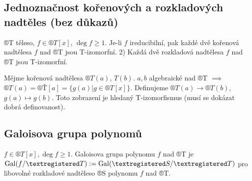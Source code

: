 \documentclass[12pt]{article}                   %
\begin{document}
    \subsection{Jednoznačnost kořenových a rozkladových nadtěles (bez důkazů)}
        \begin{veta}
            ®T těleso, $f \in ®T[x]$, $\deg f ≥ 1$. Je-li $f$ ireducibilní, pak každé dvě kořenová nadtělesa $f$ nad ®T jsou T-izomorfní. 2) Každá dvě rozkladová nadtělesa $f$ nad ®T jsou T-izomorfní.

            \begin{dukazin}[Nástřel]
                Mějme kořenová nadtělesa $®T(a)$, $T(b)$. $a, b$ algebraické nad ®T $\implies$ $®T(a) = ®Ť[a] = \{g(a) | g \in ®T[x]\}$. Definujeme $®T(a) \rightarrow ®T(b)$, $g(a) \mapsto g(b)$. Toto zobrazení je hledaný T-izomorfismus (musí se dokázat dobrá definovanost).
            \end{dukazin}
        \end{veta}

    \subsection{Galoisova grupa polynomů}
        \begin{definice}
            $f \in ®T[x], \deg f ≥ 1$. Galoisova grupa polynomu $f$ nad ®T je $\Gal(f/®T) := \Gal(®S/®T)$ pro libovolné rozkladové nadtěleso ®S polynomu $f$ nad ®T.
        \end{definice}
\end{document}
